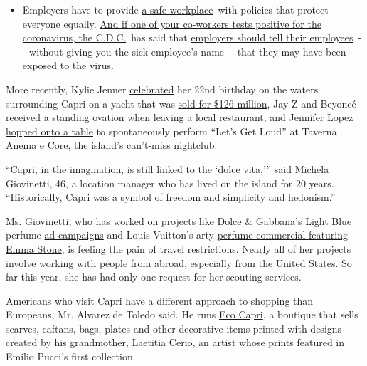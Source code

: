 \begin{itemize}
  \begin{itemize}
  \tightlist
  \item
    Employers have to provide
    \href{https://www.osha.gov/SLTC/covid-19/standards.html}{a safe
    workplace}~with policies that protect everyone equally.
    \href{https://www.nytimes3xbfgragh.onion/article/coronavirus-money-unemployment.html?action=click\&pgtype=Article\&state=default\&region=MAIN_CONTENT_3\&context=storylines_faq}{And
    if one of your co-workers tests positive for the coronavirus, the
    C.D.C.}~has said that
    \href{https://www.cdc.gov/coronavirus/2019-ncov/community/guidance-business-response.html}{employers
    should tell their employees}~-\/- without giving you the sick
    employee's name -\/- that they may have been exposed to the virus.
  \end{itemize}
\end{itemize}

More recently, Kylie Jenner
\href{https://www.theguardian.com/business/2019/aug/09/reality-tv-star-kylie-jenner-celebrates-birthday-on-1m-a-week-superyacht}{celebrated}
her 22nd birthday on the waters surrounding Capri on a yacht that was
\href{https://www.bloomberg.com/news/articles/2019-04-03/genting-to-buy-1mdb-linked-yacht-from-malaysia-for-126-million}{sold
for \$126 million}, Jay-Z and Beyoncé
\href{https://www.tmz.com/2018/07/23/jay-z-beyonce-standing-ovation-leaving-restaurant-capri/}{received
a standing ovation} when leaving a local restaurant, and Jennifer Lopez
\href{https://www.instagram.com/p/BmPSFnPA7zd/?utm_source=ig_embed}{hopped
onto a table} to spontaneously perform ``Let's Get Loud'' at Taverna
Anema e Core, the island's can't-miss nightclub.

``Capri, in the imagination, is still linked to the `dolce vita,''' said
Michela Giovinetti, 46, a location manager who has lived on the island
for 20 years. ``Historically, Capri was a symbol of freedom and
simplicity and hedonism.''

Ms. Giovinetti, who has worked on projects like Dolce \& Gabbana's Light
Blue perfume
\href{https://www.dolcegabbanabeauty.com/perfumes/light-blue/}{ad
campaigns} and Louis Vuitton's arty
\href{https://www.youtube.com/watch?v=fFv5smPPuZo}{perfume commercial
featuring Emma Stone}, is feeling the pain of travel restrictions.
Nearly all of her projects involve working with people from abroad,
especially from the United States. So far this year, she has had only
one request for her scouting services.

Americans who visit Capri have a different approach to shopping than
Europeans, Mr. Alvarez de Toledo said. He runs
\href{https://www.ecocapri.com/}{Eco Capri}, a boutique that sells
scarves, caftans, bags, plates and other decorative items printed with
designs created by his grandmother, Laetitia Cerio, an artist whose
prints featured in Emilio Pucci's first collection.


